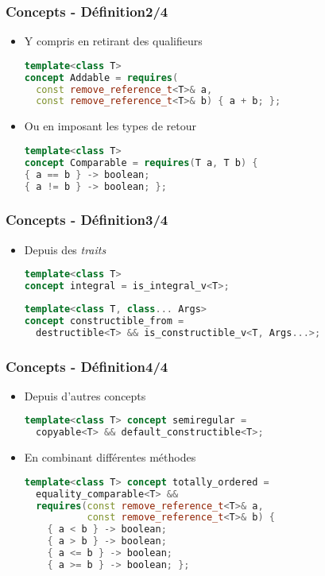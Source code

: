 \documentclass[C++.tex]{subfiles}
\begin{document}
\begin{frame}[fragile]
	\frametitle{Concepts - Définition\titlehfill{}2/4}
	\begin{itemize}
		\item Y compris en retirant des qualifieurs

		\begin{lstlisting}[language=C++]
template<class T>
concept Addable = requires(
  const remove_reference_t<T>& a,
  const remove_reference_t<T>& b) { a + b; };\end{lstlisting}

		\item Ou en imposant les types de retour

		\begin{lstlisting}[language=C++]
template<class T>
concept Comparable = requires(T a, T b) {
{ a == b } -> boolean;
{ a != b } -> boolean; };\end{lstlisting}
	\end{itemize}
\end{frame}

\begin{frame}[fragile]
	\frametitle{Concepts - Définition\titlehfill{}3/4}
	\begin{itemize}
		\item Depuis des \textit{traits}

		\begin{lstlisting}[language=C++]
template<class T>
concept integral = is_integral_v<T>;\end{lstlisting}

		\begin{lstlisting}[language=C++]
template<class T, class... Args>
concept constructible_from = 
  destructible<T> && is_constructible_v<T, Args...>;\end{lstlisting}
	\end{itemize}
\end{frame}

\begin{frame}[fragile]
	\frametitle{Concepts - Définition\titlehfill{}4/4}
	\begin{itemize}
		\item Depuis d'autres concepts

		\begin{lstlisting}[language=C++]
template<class T> concept semiregular = 
  copyable<T> && default_constructible<T>;\end{lstlisting}

		\item En combinant différentes méthodes

		\begin{lstlisting}[language=C++]
template<class T> concept totally_ordered =
  equality_comparable<T> &&
  requires(const remove_reference_t<T>& a,
           const remove_reference_t<T>& b) {
    { a < b } -> boolean;
    { a > b } -> boolean;
    { a <= b } -> boolean;
    { a >= b } -> boolean; };\end{lstlisting}
	\end{itemize}
\end{frame}
\end{document}

